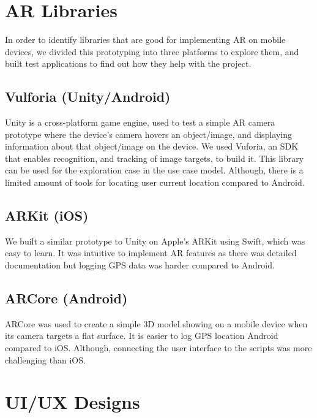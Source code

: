 
\section{AR Libraries}
In order to identify libraries that are good for implementing AR on mobile devices, we divided this prototyping into three platforms to explore them, and built test applications to find out how they help with the project.

\subsection*{Vulforia (Unity/Android)}
Unity is a cross-platform game engine, used to test a simple AR camera prototype where the device's camera hovers an object/image, and displaying information about that object/image on the device. We used Vuforia, an SDK that enables recognition, and tracking of image targets, to build it. This library can be used for the exploration case in the use case model. Although, there is a limited amount of tools for locating user current location compared to Android.

\subsection*{ARKit (iOS)}
We built a similar prototype to Unity on Apple's ARKit using Swift, which was easy to learn. It was intuitive to implement AR features as there was detailed documentation but logging GPS data was harder compared to Android.

\subsection*{ARCore (Android)}
ARCore was used to create a simple 3D model showing on a mobile device when its camera targets a flat surface. It is easier to log GPS location Android compared to iOS. Although, connecting the user interface to the scripts was more challenging than iOS.

\section{UI/UX Designs}